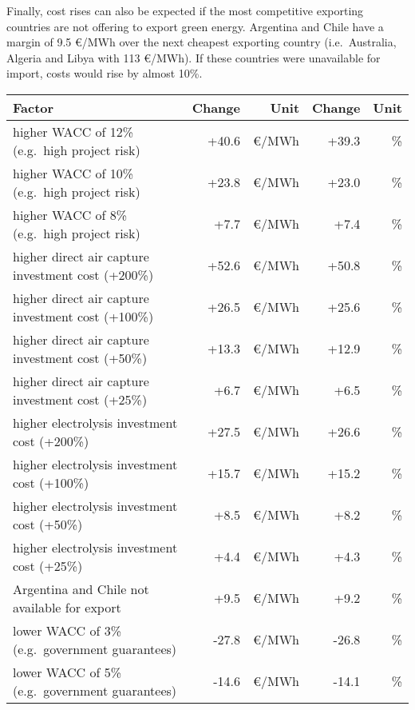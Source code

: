 Finally, cost rises can also be expected if the most competitive exporting
countries are not offering to export green energy. Argentina and Chile have a
margin of 9.5 \euro{}/MWh over the next cheapest exporting country
(i.e.~Australia, Algeria and Libya with 113 \euro{}/MWh). If these countries
were unavailable for import, costs would rise by almost 10\%.

\begin{table*}
    \small
    \centering
    \begin{tabular}{lrrrr}
        \toprule
        Factor & Change & Unit & Change & Unit\\
        \midrule
        higher WACC of 12\% (e.g.~high project risk) & +40.6 & \euro{}/MWh  & +39.3 & \% \\
        higher WACC of 10\% (e.g.~high project risk) & +23.8 & \euro{}/MWh  & +23.0 & \% \\
        higher WACC of 8\% (e.g.~high project risk) & +7.7 & \euro{}/MWh  & +7.4 & \% \\
        higher direct air capture investment cost (+200\%) & +52.6 & \euro{}/MWh  & +50.8 & \% \\
        higher direct air capture investment cost (+100\%) & +26.5 & \euro{}/MWh  & +25.6 & \% \\
        higher direct air capture investment cost (+50\%) & +13.3 & \euro{}/MWh  & +12.9 & \% \\
        higher direct air capture investment cost (+25\%) & +6.7 & \euro{}/MWh  & +6.5 & \% \\
        higher electrolysis investment cost (+200\%) & +27.5 & \euro{}/MWh  & +26.6 & \% \\
        higher electrolysis investment cost (+100\%) & +15.7 & \euro{}/MWh  & +15.2 & \% \\
        higher electrolysis investment cost (+50\%) & +8.5 & \euro{}/MWh  & +8.2 & \% \\
        higher electrolysis investment cost (+25\%) & +4.4 & \euro{}/MWh  & +4.3 & \% \\
        Argentina and Chile not available for export & +9.5 & \euro{}/MWh  & +9.2 & \% \\
        \midrule
        lower WACC of 3\% (e.g.~government guarantees) & -27.8 & \euro{}/MWh  & -26.8 & \% \\
        lower WACC of 5\% (e.g.~government guarantees) & -14.6 & \euro{}/MWh  & -14.1 & \% \\

\end{tabular}
\end{table*}
